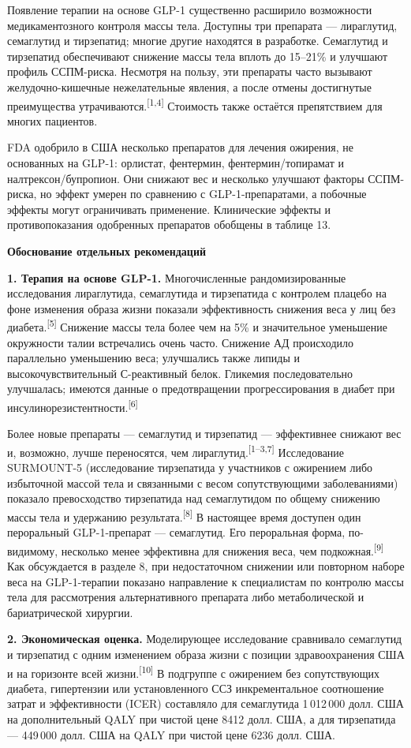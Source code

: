 \documentclass[11pt,a4paper]{article}
\newcommand{\src}[1]{\textsuperscript{[#1]}}
\newcommand{\heading}[1]{\par\medskip\textbf{#1}\par}
\begin{document}
Появление терапии на основе GLP-1 существенно расширило возможности медикаментозного контроля массы тела. Доступны три препарата --- лираглутид, семаглутид и тирзепатид; многие другие находятся в разработке. Семаглутид и тирзепатид обеспечивают снижение массы тела вплоть до 15--21\% и улучшают профиль ССПМ-риска. Несмотря на пользу, эти препараты часто вызывают желудочно-кишечные нежелательные явления, а после отмены достигнутые преимущества утрачиваются.\src{1,4} Стоимость также остаётся препятствием для многих пациентов.

FDA одобрило в США несколько препаратов для лечения ожирения, не основанных на GLP-1: орлистат, фентермин, фентермин/топирамат и налтрексон/бупропион. Они снижают вес и несколько улучшают факторы ССПМ-риска, но эффект умерен по сравнению с GLP-1-препаратами, а побочные эффекты могут ограничивать применение. Клинические эффекты и противопоказания одобренных препаратов обобщены в таблице 13.

\heading{Обоснование отдельных рекомендаций}
\textbf{1. Терапия на основе GLP-1.} Многочисленные рандомизированные исследования лираглутида, семаглутида и тирзепатида с контролем плацебо на фоне изменения образа жизни показали эффективность снижения веса у лиц без диабета.\src{5} Снижение массы тела более чем на 5\% и значительное уменьшение окружности талии встречались очень часто. Снижение АД происходило параллельно уменьшению веса; улучшались также липиды и высокочувствительный С-реактивный белок. Гликемия последовательно улучшалась; имеются данные о предотвращении прогрессирования в диабет при инсулинорезистентности.\src{6}

Более новые препараты --- семаглутид и тирзепатид --- эффективнее снижают вес и, возможно, лучше переносятся, чем лираглутид.\src{1--3,7} Исследование SURMOUNT-5 (исследование тирзепатида у участников с ожирением либо избыточной массой тела и связанными с весом сопутствующими заболеваниями) показало превосходство тирзепатида над семаглутидом по общему снижению массы тела и удержанию результата.\src{8} В настоящее время доступен один пероральный GLP-1-препарат --- семаглутид. Его пероральная форма, по-видимому, несколько менее эффективна для снижения веса, чем подкожная.\src{9} Как обсуждается в разделе 8, при недостаточном снижении или повторном наборе веса на GLP-1-терапии показано направление к специалистам по контролю массы тела для рассмотрения альтернативного препарата либо метаболической и бариатрической хирургии.

\textbf{2. Экономическая оценка.} Моделирующее исследование сравнивало семаглутид и тирзепатид с одним изменением образа жизни с позиции здравоохранения США и на горизонте всей жизни.\src{10} В подгруппе с ожирением без сопутствующих диабета, гипертензии или установленного ССЗ инкрементальное соотношение затрат и эффективности (ICER) составляло для семаглутида 1\,012\,000 долл. США на дополнительный QALY при чистой цене 8412 долл. США, а для тирзепатида --- 449\,000 долл. США на QALY при чистой цене 6236 долл. США.
\end{document}
